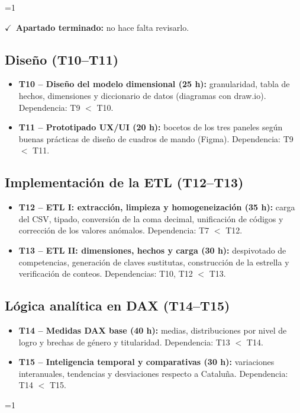 \documentclass[12pt, a4paper, oneside]{report}
\newcommand{\mostrarterminados}{1}
\newenvironment{revisado}
  {\ifnum\mostrarterminados=1\relax\begin{cajarevisada}\noindent\colorbox{verdeterminado}{\parbox{\dimexpr\linewidth-2\fboxsep\relax}{\small$\checkmark$\ \textbf{Apartado terminado:} no hace falta revisarlo.}}\par\medskip\fi}
  {\ifnum\mostrarterminados=1\relax\end{cajarevisada}\fi}
\begin{document}
\begin{revisado}
\subsection{Diseño (T10--T11)}
\begin{itemize}
    \item \textbf{T10 -- Diseño del modelo dimensional (25 h):} granularidad, tabla de hechos, dimensiones y diccionario de datos (diagramas con draw.io). Dependencia: T9 $<$ T10.
    \item \textbf{T11 -- Prototipado UX/UI (20 h):} bocetos de los tres paneles según buenas prácticas de diseño de cuadros de mando \cite{few2006information} (Figma). Dependencia: T9 $<$ T11.
\end{itemize}

\subsection{Implementación de la ETL (T12--T13)}
\begin{itemize}
    \item \textbf{T12 -- ETL I: extracción, limpieza y homogeneización (35 h):} carga del CSV, tipado, conversión de la coma decimal, unificación de códigos y corrección de los valores anómalos. Dependencia: T7 $<$ T12.
    \item \textbf{T13 -- ETL II: dimensiones, hechos y carga (30 h):} despivotado de competencias, generación de claves sustitutas, construcción de la estrella y verificación de conteos. Dependencias: T10, T12 $<$ T13.
\end{itemize}

\subsection{Lógica analítica en DAX (T14--T15)}
\begin{itemize}
    \item \textbf{T14 -- Medidas DAX base (40 h):} medias, distribuciones por nivel de logro y brechas de género y titularidad. Dependencia: T13 $<$ T14.
    \item \textbf{T15 -- Inteligencia temporal y comparativas (30 h):} variaciones interanuales, tendencias y desviaciones respecto a Cataluña. Dependencia: T14 $<$ T15.
\end{itemize}


\end{revisado}
\end{document}
